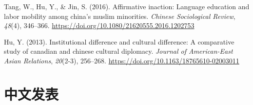 \documentclass[
  12pt,
]
{article}
\newlength{\cslhangindent}
\newlength{\cslentryspacingunit} %
\newenvironment{CSLReferences}[2] %
 {%
  \setlength{\parindent}{0pt}
  \ifodd #1
  \let\oldpar\par
  \def\par{\hangindent=\cslhangindent\oldpar}
  \fi
  \setlength{\parskip}{#2\cslentryspacingunit}
 }%
 {}
\begin{document}
\begin{CSLReferences}{1}{0}
\leavevmode{}%
Tang, W., Hu, Y., \& Jin, S. (2016). Affirmative inaction: Language
education and labor mobility among china's muslim minorities.
\emph{Chinese Sociological Review}, \emph{48}(4), 346--366.
\url{https://doi.org/10.1080/21620555.2016.1202753}

\leavevmode{}%
Hu, Y. (2013). Institutional difference and cultural difference: A
comparative study of canadian and chinese cultural diplomacy.
\emph{Journal of American-East Asian Relations}, \emph{20}(2-3),
256--268. \url{https://doi.org/10.1163/18765610-02003011}

\end{CSLReferences}

\hypertarget{ux4e2dux6587ux53d1ux8868}{%
\section{中文发表}\label{ux4e2dux6587ux53d1ux8868}}
\end{document}
